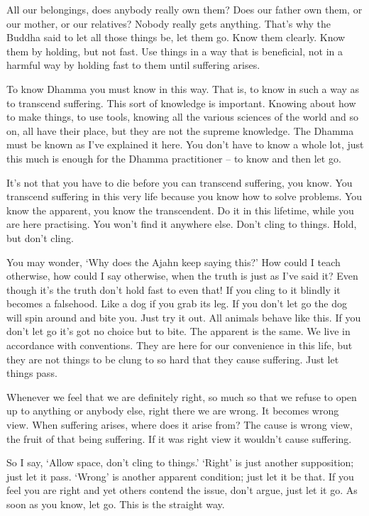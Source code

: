 All our belongings, does anybody really own them? Does our father own them, or our mother, or our relatives? Nobody really gets anything. That's why the Buddha said to let all those things be, let them go. Know them clearly. Know them by holding, but not fast. Use things in a way that is beneficial, not in a harmful way by holding fast to them until suffering arises. 

To know Dhamma you must know in this way. That is, to know in such a way as to transcend suffering. This sort of knowledge is important. Knowing about how to make things, to use tools, knowing all the various sciences of the world and so on, all have their place, but they are not the supreme knowledge. The Dhamma must be known as I've explained it here. You don't have to know a whole lot, just this much is enough for the Dhamma practitioner -- to know and then let go. 

It's not that you have to die before you can transcend suffering, you know. You transcend suffering in this very life because you know how to solve problems. You know the apparent, you know the transcendent. Do it in this lifetime, while you are here practising. You won't find it anywhere else. Don't cling to things. Hold, but don't cling. 

You may wonder, `Why does the Ajahn keep saying this?' How could I teach otherwise, how could I say otherwise, when the truth is just as I've said it? Even though it's the truth don't hold fast to even that! If you cling to it blindly it becomes a falsehood. Like a dog if you grab its leg. If you don't let go the dog will spin around and bite you. Just try it out. All animals behave like this. If you don't let go it's got no choice but to bite. The apparent is the same. We live in accordance with conventions. They are here for our convenience in this life, but they are not things to be clung to so hard that they cause suffering. Just let things pass. 

Whenever we feel that we are definitely right, so much so that we refuse to open up to anything or anybody else, right there we are wrong. It becomes wrong view. When suffering arises, where does it arise from? The cause is wrong view, the fruit of that being suffering. If it was right view it wouldn't cause suffering. 

So I say, `Allow space, don't cling to things.' `Right' is just another supposition; just let it pass. `Wrong' is another apparent condition; just let it be that. If you feel you are right and yet others contend the issue, don't argue, just let it go. As soon as you know, let go. This is the straight way. 

